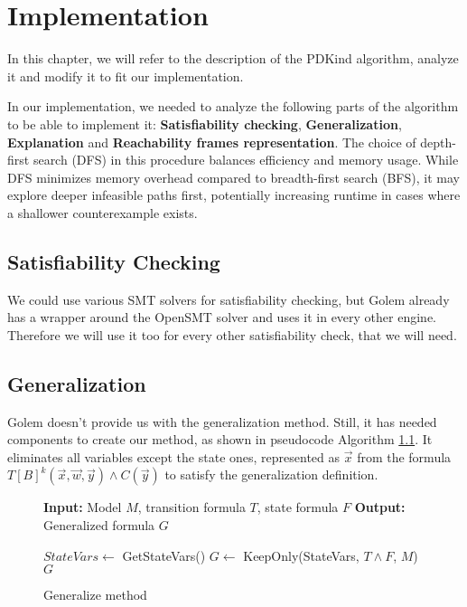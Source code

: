 \chapter{Implementation}
\noindent In this chapter, we will refer to the description of the PDKind algorithm, analyze it and modify it to fit our implementation.

In our implementation, we needed to analyze the following parts of the algorithm to be able to implement it: \textbf{Satisfiability checking}, \textbf{Generalization}, \textbf{Explanation} and \textbf{Reachability frames representation}.
The choice of depth-first search (DFS) in this procedure balances efficiency and memory usage. While DFS minimizes memory overhead compared to breadth-first search (BFS), it may explore deeper infeasible paths first, potentially increasing runtime in cases where a shallower counterexample exists.
\section*{Satisfiability Checking}
\noindent We could use various SMT solvers for satisfiability checking, but Golem already has a wrapper around the OpenSMT solver and uses it in every other engine. Therefore we will use it too for every other satisfiability check, that we will need.

\section*{Generalization}
\noindent Golem doesn't provide us with the generalization method. Still, it has needed components to create our method, as shown in pseudocode Algorithm \ref{alg:2}. It eliminates all variables except the state ones, represented as $\vec{x}$ from the formula \( T[B]^k(\vec{x}, \vec{w}, \vec{y}) \wedge C(\vec{y}) \) to satisfy the generalization definition.
\begin{figure}[H]
    \begin{mdframed}
        \begin{algorithmic}[1]
            \State \textbf{Input:} Model $M$, transition formula $T$, state formula $F$
            \State \textbf{Output:} Generalized formula $G$

            \State $StateVars \gets$ GetStateVars()
            \State $G \gets$ KeepOnly(StateVars, $T \wedge F$, $M$)
            \State \Return $G$

        \end{algorithmic}
    \end{mdframed}
    \caption{Generalize method}\label{alg:2}
\end{figure}

